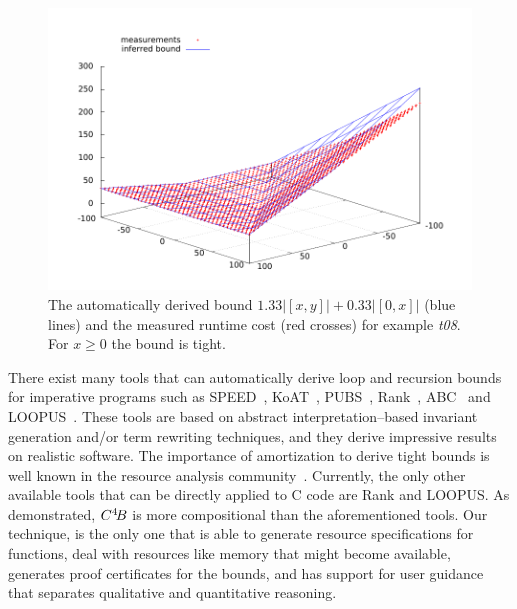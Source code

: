 \documentclass[nocopyrightspace,preprint,pldi]{sigplanconf-pldi15}
\begin{document}
\begin{figure}[t]
\center
\includegraphics[width=.9\linewidth]{fig/bound3d}
\caption{The automatically derived bound $1.33|[x,y]| + 0.33 |[0,x]|$
  (blue lines) and the measured runtime cost (red crosses) for example
  \emph{t08}. For $x\ge 0$ the bound is tight.}
\label{fig:3d}
\end{figure}

There exist many tools that can automatically derive loop and
recursion bounds for imperative programs such as
SPEED~\cite{GulwaniMC09,GulwaniZ10}, KoAT~\cite{BrockschmidtEFFG14},
PUBS~\cite{AlbertAGPZ12}, Rank~\cite{AliasDFG10},
ABC~\cite{BlancHHK10} and LOOPUS~\cite{Zuleger11,SinnZV14}.  These
tools are based on abstract interpretation--based invariant generation
and/or term rewriting techniques, and they derive impressive results
on realistic software.  The importance of amortization to derive tight
bounds is well known in the resource analysis
community~\cite{AlonsoG12,Moser14,SinnZV14}.  Currently, the only
other available tools that can be directly applied to C code are Rank
and LOOPUS.  As demonstrated, $C^4\!B$ is more compositional than
the aforementioned tools. Our technique, is the only one that is able
to generate resource specifications for functions, deal with resources
like memory that might become available, generates proof certificates
for the bounds, and has support for user guidance that separates
qualitative and quantitative reasoning.
\end{document}
